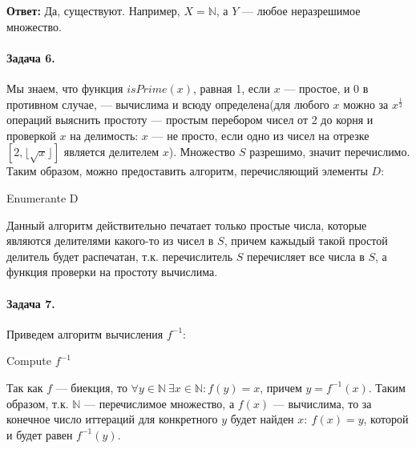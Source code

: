 \documentclass{article}
\newcommand{\N}{\mathbb{N}}
\begin{document}
    \textbf{Ответ:} Да, существуют. Например,  $X = \N$, а $Y $ --- любое неразрешимое множество.

    \paragraph{Задача 6.}
    Мы знаем, что функция $isPrime(x)$, равная 1, если $x $ --- простое, и 0 в противном случае, --- вычислима и всюду определена(для любого $x$ можно за $x^{\frac{1}{2}}$ операций выяснить простоту --- простым перебором чисел от 2 до корня и проверкой $x$ на делимость: $x$ --- не просто, если одно из чисел на отрезке $[2, \lfloor \sqrt{x} \rfloor]$ является делителем $x$). Множество $S$ разрешимо, значит перечислимо. Таким образом, можно предоставить алгоритм, перечисляющий элементы $D$:

    \begin{algorithm}[H]
        \SetAlgoLined %

        \caption{Enumerante D}
    \end{algorithm}

    Данный алгоритм действительно печатает только простые числа, которые являются делителями какого-то из чисел в $S$, причем кажыдый такой простой делитель будет распечатан, т.к. перечислитель $S$ перечисляет все числа в $S$, а функция проверки на простоту вычислима.

    \paragraph{Задача 7.}
    Приведем алгоритм вычисления $f^{-1}$:

        \begin{algorithm}[H]
        \SetAlgoLined %

        \For{ $x \in \N$ }{
            \If {$y = f(x)$} {
                 print(x);
                 break;
            }
        }
        \caption{Compute $f^{-1}$}
    \end{algorithm}

    Так как $f$ --- биекция, то $\forall y \in \N\ \exists x \in \N: f(y) = x$, причем $y = f^{-1}(x)$. Таким образом, т.к. $\N$ --- перечислимое множество, а $f(x)$ --- вычислима, то за конечное число иттераций для конкретного $y$ будет найден $x:\ f(x) = y$, которой и будет равен $f^{-1}(y)$.

   
\end{document}
